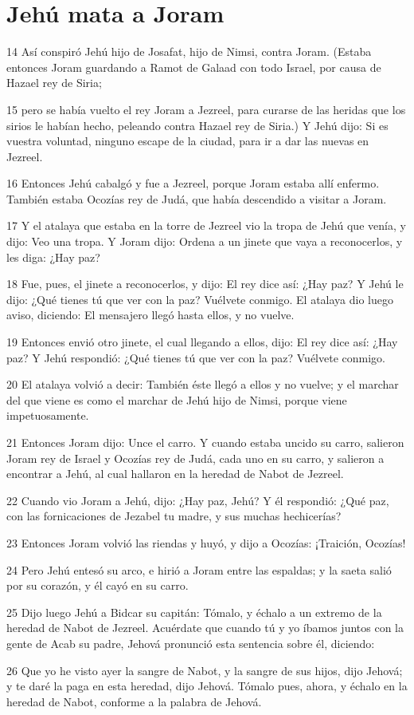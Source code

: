 \section*{Jehú mata a Joram}

\par 14 Así conspiró Jehú hijo de Josafat, hijo de Nimsi, contra Joram. (Estaba entonces Joram guardando a Ramot de Galaad con todo Israel, por causa de Hazael rey de Siria;
\par 15 pero se había vuelto el rey Joram a Jezreel, para curarse de las heridas que los sirios le habían hecho, peleando contra Hazael rey de Siria.) Y Jehú dijo: Si es vuestra voluntad, ninguno escape de la ciudad, para ir a dar las nuevas en Jezreel.
\par 16 Entonces Jehú cabalgó y fue a Jezreel, porque Joram estaba allí enfermo. También estaba Ocozías rey de Judá, que había descendido a visitar a Joram.
\par 17 Y el atalaya que estaba en la torre de Jezreel vio la tropa de Jehú que venía, y dijo: Veo una tropa. Y Joram dijo: Ordena a un jinete que vaya a reconocerlos, y les diga: ¿Hay paz?
\par 18 Fue, pues, el jinete a reconocerlos, y dijo: El rey dice así: ¿Hay paz? Y Jehú le dijo: ¿Qué tienes tú que ver con la paz? Vuélvete conmigo. El atalaya dio luego aviso, diciendo: El mensajero llegó hasta ellos, y no vuelve.
\par 19 Entonces envió otro jinete, el cual llegando a ellos, dijo: El rey dice así: ¿Hay paz? Y Jehú respondió: ¿Qué tienes tú que ver con la paz? Vuélvete conmigo.
\par 20 El atalaya volvió a decir: También éste llegó a ellos y no vuelve; y el marchar del que viene es como el marchar de Jehú hijo de Nimsi, porque viene impetuosamente.
\par 21 Entonces Joram dijo: Unce el carro. Y cuando estaba uncido su carro, salieron Joram rey de Israel y Ocozías rey de Judá, cada uno en su carro, y salieron a encontrar a Jehú, al cual hallaron en la heredad de Nabot de Jezreel.
\par 22 Cuando vio Joram a Jehú, dijo: ¿Hay paz, Jehú? Y él respondió: ¿Qué paz, con las fornicaciones de Jezabel tu madre, y sus muchas hechicerías?
\par 23 Entonces Joram volvió las riendas y huyó, y dijo a Ocozías: ¡Traición, Ocozías!
\par 24 Pero Jehú entesó su arco, e hirió a Joram entre las espaldas; y la saeta salió por su corazón, y él cayó en su carro.
\par 25 Dijo luego Jehú a Bidcar su capitán: Tómalo, y échalo a un extremo de la heredad de Nabot de Jezreel. Acuérdate que cuando tú y yo íbamos juntos con la gente de Acab su padre, Jehová pronunció esta sentencia sobre él, diciendo:
\par 26 Que yo he visto ayer la sangre de Nabot, y la sangre de sus hijos, dijo Jehová; y te daré la paga en esta heredad, dijo Jehová. Tómalo pues, ahora, y échalo en la heredad de Nabot, conforme a la palabra de Jehová.

